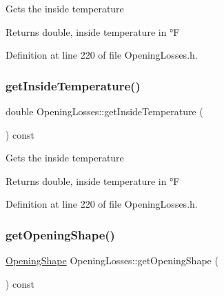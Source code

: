 Gets the inside temperature \begin{DoxyReturn}{Returns}
double, inside temperature in °F 
\end{DoxyReturn}


Definition at line 220 of file Opening\+Losses.\+h.

\mbox{\label{class_opening_losses_abe930dab77b1c855503ee51fdf66c88a}} 
\subsubsection{\texorpdfstring{get\+Inside\+Temperature()}{getInsideTemperature()}\hspace{0.1cm}{\footnotesize\ttfamily [3/3]}}
{\footnotesize\ttfamily double Opening\+Losses\+::get\+Inside\+Temperature (\begin{DoxyParamCaption}{ }\end{DoxyParamCaption}) const\hspace{0.3cm}{\ttfamily [inline]}}

Gets the inside temperature \begin{DoxyReturn}{Returns}
double, inside temperature in °F 
\end{DoxyReturn}


Definition at line 220 of file Opening\+Losses.\+h.

\mbox{\label{class_opening_losses_a5046cd699178e4edca774d0d0da7965a}} 
\subsubsection{\texorpdfstring{get\+Opening\+Shape()}{getOpeningShape()}\hspace{0.1cm}{\footnotesize\ttfamily [1/3]}}
{\footnotesize\ttfamily \hyperlink{class_opening_losses_a57f9759b6fd72a1b75aa885800e26157}{Opening\+Shape} Opening\+Losses\+::get\+Opening\+Shape (\begin{DoxyParamCaption}{ }\end{DoxyParamCaption}) const\hspace{0.3cm}{\ttfamily [inline]}}

